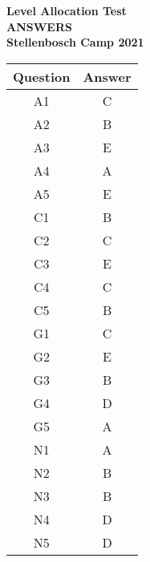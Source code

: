 \documentclass{article}
\begin{document}
\thispagestyle{empty}

\begin{center}
  \textbf{\Large Level Allocation Test}
  \\ \vspace{1em}
  \textbf{\Large ANSWERS}
  \\ \vspace{1em}
  \textbf{\large Stellenbosch Camp 2021}
\end{center}

\vspace{24pt}
\begin{table}[!htb]
    \centering
    \begin{tabular}{| c | c |}
        \hline
        Question & Answer \\
        \hline 
        A1 & C\\
        A2 & B\\
        A3 & E\\
        A4 & A\\
        A5 & E\\
        \hline
        C1 & B\\
        C2 & C\\
        C3 & E\\
        C4 & C\\
        C5 & B\\
        \hline
        G1 & C\\
        G2 & E\\
        G3 & B\\
        G4 & D\\
        G5 & A\\
        \hline
        N1 & A\\
        N2 & B\\
        N3 & B\\
        N4 & D\\
        N5 & D\\ 
        \hline
    \end{tabular}
\end{table}
\end{document}
